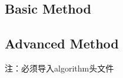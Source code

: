 \documentclass[10pt,UTF8,a4paper,twoside]{ctexart}
\begin{document}
\begin{multicols}{2}
\begin{appendices}
		\subsection{Basic Method}
			
		\subsection{Advanced Method}
			注：必须导入algorithm头文件
			
		
\end{appendices}

\end{multicols}
\end{document}
